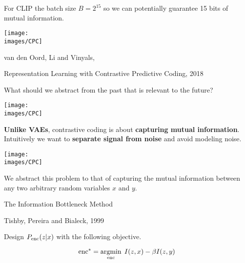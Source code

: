 {\vfill
For CLIP the batch size $B = 2^{15}$ so we can potentially guarantee 15 bits of mutual information.


\centerline{\texttt{[image: \\images/CPC]}}
\centerline{\huge van den Oord, Li and Vinyals,}
\centerline{\huge Representation Learning with Contrastive Predictive Coding, 2018}

\vfill
What should we abstract from the past that is relevant to the future?

\centerline{\texttt{[image: \\images/CPC]}}

\vfill
{\bf Unlike VAEs}, contrastive coding is about {\bf capturing mutual information}.
Intuitively we want to {\bf separate signal from noise} and avoid modeling noise.

\centerline{\texttt{[image: \\images/CPC]}}

\vfill
We abstract this problem to that of capturing the mutual information between any two arbitrary random variables $x$ and $y$.


\centerline{The Information Bottleneck Method}
\centerline{Tishby, Pereira and Bialeck, 1999}

\vfill
Design $P_{\mathrm{enc}}(z|x)$ with the following objective.

\vfill
$$\mathrm{enc}^* = \operatorname*{argmin}_{\mathrm{enc}}\;I(z,x) - \beta I(z,y)$$


}


